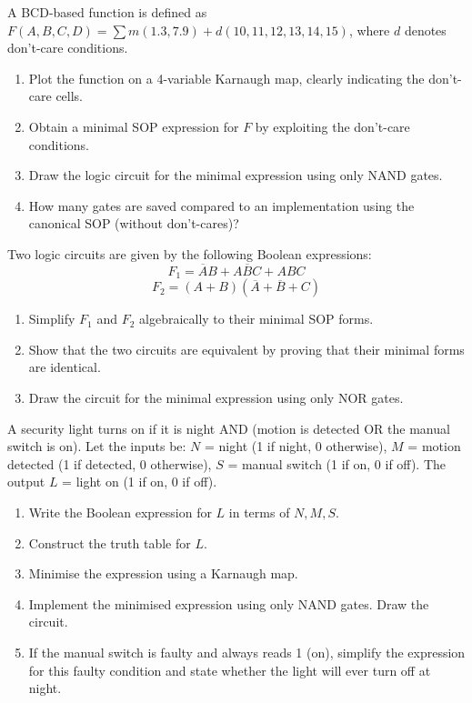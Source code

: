 \documentclass[11pt]{article}
\begin{document}
\begin{exercice}
A BCD-based function is defined as \(F(A,B,C,D) = \sum m(1.3,7.9) + d(10,11,12,13,14,15)\), where \(d\) denotes don't-care conditions.
\begin{enumerate}
\item Plot the function on a 4-variable Karnaugh map, clearly indicating the don't-care cells.
\item Obtain a minimal SOP expression for \(F\) by exploiting the don't-care conditions.
\item Draw the logic circuit for the minimal expression using only NAND gates.
\item How many gates are saved compared to an implementation using the canonical SOP (without don't-cares)?
\end{enumerate}
\end{exercice}

\begin{exercice}
Two logic circuits are given by the following Boolean expressions:
\[
F_1 = \overline{A}B + A\overline{B}C + ABC
\]
\[
F_2 = (A + B)(\overline{A} + \overline{B} + C)
\]
\begin{enumerate}
\item Simplify \(F_1\) and \(F_2\) algebraically to their minimal SOP forms.
\item Show that the two circuits are equivalent by proving that their minimal forms are identical.
\item Draw the circuit for the minimal expression using only NOR gates.
\end{enumerate}
\end{exercice}

\begin{exercice}
A security light turns on if it is night AND (motion is detected OR the manual switch is on).
Let the inputs be:
\(N\) = night (1 if night, 0 otherwise),
\(M\) = motion detected (1 if detected, 0 otherwise),
\(S\) = manual switch (1 if on, 0 if off).
The output \(L\) = light on (1 if on, 0 if off).
\begin{enumerate}
\item Write the Boolean expression for \(L\) in terms of \(N, M, S\).
\item Construct the truth table for \(L\).
\item Minimise the expression using a Karnaugh map.
\item Implement the minimised expression using only NAND gates. Draw the circuit.
\item If the manual switch is faulty and always reads 1 (on), simplify the expression for this faulty condition and state whether the light will ever turn off at night.
\end{enumerate}
\end{exercice}
\end{document}
